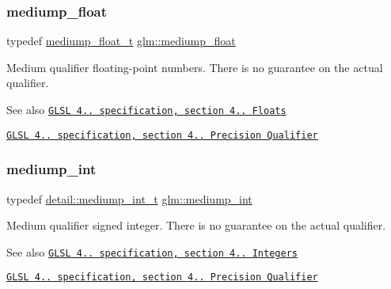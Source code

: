 \subsubsection{\texorpdfstring{mediump\+\_\+float}{mediump\_float}}
{\footnotesize\ttfamily typedef \hyperlink{namespaceglm_aec127979a2b6edbf05b485cb4e8c47cc}{mediump\+\_\+float\+\_\+t} \hyperlink{group__core__precision_gac785826c039fe6c97c03b37c81c1a68e}{glm\+::mediump\+\_\+float}}

Medium qualifier floating-\/point numbers. There is no guarantee on the actual qualifier.

\begin{DoxySeeAlso}{See also}
\href{http://www.opengl.org/registry/doc/GLSLangSpec.4.20.8.pdf}{\tt G\+L\+SL 4.. specification, section 4.. Floats} 

\href{http://www.opengl.org/registry/doc/GLSLangSpec.4.20.8.pdf}{\tt G\+L\+SL 4.. specification, section 4.. Precision Qualifier} 
\end{DoxySeeAlso}
\mbox{\label{group__core__precision_ga2a3dcbcd7f4e17663d393a12061ac6ac}} 
\subsubsection{\texorpdfstring{mediump\+\_\+int}{mediump\_int}}
{\footnotesize\ttfamily typedef \hyperlink{namespaceglm_1_1detail_aede0757f19204d1d44f716b3dd66d13c}{detail\+::mediump\+\_\+int\+\_\+t} \hyperlink{group__core__precision_ga2a3dcbcd7f4e17663d393a12061ac6ac}{glm\+::mediump\+\_\+int}}

Medium qualifier signed integer. There is no guarantee on the actual qualifier.

\begin{DoxySeeAlso}{See also}
\href{http://www.opengl.org/registry/doc/GLSLangSpec.4.20.8.pdf}{\tt G\+L\+SL 4.. specification, section 4.. Integers} 

\href{http://www.opengl.org/registry/doc/GLSLangSpec.4.20.8.pdf}{\tt G\+L\+SL 4.. specification, section 4.. Precision Qualifier} 
\end{DoxySeeAlso}
\mbox{\label{group__core__precision_ga0efcfa6750f1c7197ff1c3390521ffd7}} 

